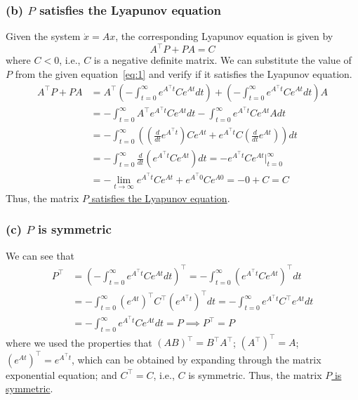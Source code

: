\subsubsection*{(b) \( P \) satisfies the Lyapunov equation}

Given the system \( \dot x = A x \), the corresponding Lyapunov equation is given by
\begin{equation*}
    A^{\top} P + P A = C
\end{equation*}
where \( C < 0 \), i.e., \( C \) is a negative definite matrix.
We can substitute the value of \( P \) from the given equation~\eqref{eq:1} and verify if it satisfies the Lyapunov equation.
\begin{align*}
    A^\top P + P A
     & =
    A^\top \left( -\int_{t=0}^{\infty} e^{A^{\top} t} C e^{A t} d t \right) + \left( -\int_{t=0}^{\infty} e^{A^{\top} t} C e^{A t} d t \right) A
    \\ & =
    -\int_{t=0}^{\infty} A^\top e^{A^{\top} t} C e^{A t} d t - \int_{t=0}^{\infty} e^{A^{\top} t} C e^{A t} A d t
    \\ & =
    -\int_{t=0}^{\infty} \left( \left( \frac{d}{dt} e^{A^{\top} t} \right) C e^{A t} + e^{A^{\top} t} C \left( \frac{d}{dt} e^{A t} \right) \right) d t
    \\ & =
    -\int_{t=0}^{\infty} \frac{d}{dt} \left( e^{A^{\top} t} C e^{A t} \right) d t
    =
    - e^{A^{\top} t} C e^{A t} \Big|_{t=0}^{\infty}
    \\ & =
    - \lim_{t \to \infty} e^{A^{\top} t} C e^{A t} + e^{A^{\top} 0} C e^{A 0}
    =
    - 0 + C
    =
    C
\end{align*}
Thus, the matrix \underline{\( P \) satisfies the Lyapunov equation}.

\subsubsection*{(c) \( P \) is symmetric}

We can see that
\begin{align*}
    P^\top
     & =
    {\left( -\int_{t=0}^{\infty} e^{A^{\top} t} C e^{A t} d t \right)}^\top
    =
    -\int_{t=0}^{\infty} {\left( e^{A^{\top} t} C e^{A t} \right)}^\top d t
    \\ & =
    -\int_{t=0}^{\infty} {\left( e^{A t} \right)}^\top C^\top {\left( e^{A^{\top} t} \right)}^\top d t
    =
    -\int_{t=0}^{\infty} e^{A^\top t} C^\top e^{A t} d t
    \\ & =
    - \int_{t=0}^{\infty} e^{A^\top t} C e^{A t} d t
    =
    P
    \implies
    \boxed{
        P^\top = P
    }
\end{align*}
where we used the properties that \( {(AB)}^\top = B^\top A^\top \); \( {(A^\top)}^\top = A \); \( {(e^{A t})}^\top = e^{A^\top t} \), which can be obtained by expanding through the matrix exponential equation; and \( C^\top = C \), i.e., \( C \) is symmetric.
Thus, the matrix \underline{\( P \) is symmetric}.

